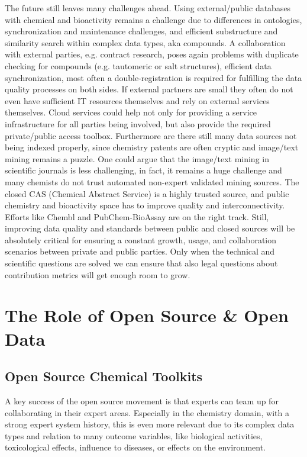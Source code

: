 \documentclass{sig-alternate}
\begin{document}
The future still leaves many challenges ahead. Using external/public databases
with chemical and bioactivity remains a challenge due to differences in
ontologies, synchronization and maintenance challenges, and efficient
substructure and similarity search within complex data types, aka compounds. A
collaboration with external parties, e.g. contract research, poses again
problems with duplicate checking for compounds (e.g. tautomeric or salt
structures), efficient data synchronization, most often a double-registration is
required for fulfilling the data quality processes on both sides. If external
partners are small they often do not even have sufficient IT resources
themselves and rely on external services themselves. Cloud services could help
not only for providing a service infrastructure for all parties being involved,
but also provide the required private/public access toolbox. Furthermore are
there still many data sources not being indexed properly, since chemistry
patents are often cryptic and image/text mining remains a puzzle. One could
argue that the image/text mining in scientific journals is less challenging, in
fact, it remains a huge challenge and many chemists do not trust automated
non-expert validated mining sources. The closed CAS (Chemical Abstract Service)
is a highly trusted source, and public chemistry and bioactivity space has to
improve quality and interconnectivity. Efforts like Chembl and PubChem-BioAssay
are on the right track. Still, improving data quality and standards between
public and closed sources will be absolutely critical for ensuring a constant
growth, usage, and collaboration scenarios between private and public parties.
Only when the technical and scientific questions are solved we can ensure that
also legal questions about contribution metrics will get enough room to grow.

\section{The Role of Open Source \& Open Data}
\label{sec:role-open-source}


\subsection{Open Source Chemical Toolkits}

A key success of the open source movement is that experts can team up for
collaborating in their expert areas. Especially in the chemistry domain, with a
strong expert system history, this is even more relevant due to its complex data
types and relation to many outcome variables, like biological activities,
toxicological effects, influence to diseases, or effects on the environment.
\end{document}
